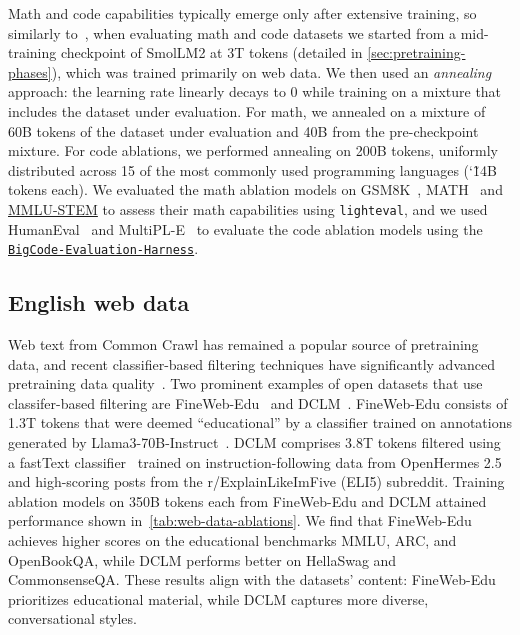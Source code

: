\documentclass{article}
\theoremstyle{plain}
\theoremstyle{definition}
\theoremstyle{remark}
\begin{document}
Math and code capabilities typically emerge only after extensive training, so  
similarly to~\citet{blakeney2024does,dubey2024llama,olmo2_2024}, when evaluating math and code datasets we started from a mid-training checkpoint of SmolLM2 at 3T tokens (detailed in \cref{sec:pretraining-phases}), which was trained primarily on web data. We then used an \textit{annealing} approach: the learning rate linearly decays to 0 while training on a mixture that includes the dataset under evaluation.
For math, we annealed on a mixture of 60B tokens of the dataset under evaluation and 40B from the pre-checkpoint mixture.
For code ablations, we performed annealing on 200B tokens, uniformly distributed across 15 of the most commonly used programming languages (\char`\~14B tokens each). 
We evaluated the math ablation models on GSM8K~\cite{cobbe2021training}, MATH~\cite{hendrycks2021measuring} and \href{https://huggingface.co/datasets/TIGER-Lab/MMLU-STEM}{MMLU-STEM} to assess their math capabilities using \texttt{lighteval}, and we used HumanEval~\cite{chen2021evaluating} and MultiPL-E~\cite{cassano2022multipl} to evaluate the code ablation models using the \href{https://github.com/bigcode-project/bigcode-evaluation-harness}{\texttt{BigCode-Evaluation-Harness}}.

\subsection{English web data}
Web text from Common Crawl has remained a popular source of pretraining data, and recent classifier-based filtering techniques have significantly advanced pretraining data quality~\cite{dubey2024llama,abdin2024phi,abdin2024phi3,kong2024large}.
Two prominent examples of open datasets that use classifer-based filtering are FineWeb-Edu~\cite{Penedo2024TheFD} and DCLM~\cite{li2024datacomp}.
FineWeb-Edu consists of 1.3T tokens that were deemed ``educational'' by a classifier trained on annotations generated by Llama3-70B-Instruct~\cite{dubey2024llama}.
DCLM comprises 3.8T tokens filtered using a fastText classifier~\cite{joulin2016fasttext,joulin2016bag} trained on instruction-following data from OpenHermes 2.5~\cite{OpenHermes-2.5} and high-scoring posts from the r/ExplainLikeImFive (ELI5) subreddit.
Training ablation models on 350B tokens each from FineWeb-Edu and DCLM attained performance shown in~\cref{tab:web-data-ablations}. 
We find that FineWeb-Edu achieves higher scores on the educational benchmarks MMLU, ARC, and OpenBookQA, while DCLM performs better on HellaSwag and CommonsenseQA.
These results align with the datasets' content: FineWeb-Edu prioritizes educational material, while DCLM captures more diverse, conversational styles.
\end{document}
